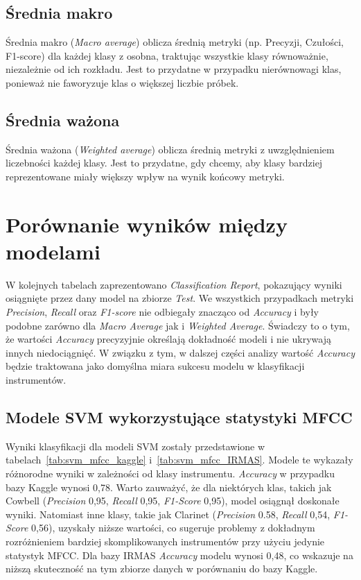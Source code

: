 \documentclass{SGGW-thesis}
\begin{document}
\subsection{Średnia makro}
Średnia makro (\textit{Macro average}) oblicza średnią metryki (np. Precyzji, Czułości, F1-score) dla każdej klasy z osobna, traktując wszystkie klasy równoważnie, niezależnie od ich rozkładu. Jest to przydatne w przypadku nierównowagi klas, ponieważ nie faworyzuje klas o większej liczbie próbek.

\subsection{Średnia ważona}
Średnia ważona (\textit{Weighted average}) oblicza średnią metryki z uwzględnieniem liczebności każdej klasy. Jest to przydatne, gdy chcemy, aby klasy bardziej reprezentowane miały większy wpływ na wynik końcowy metryki.

\section{Porównanie wyników między modelami}
W kolejnych tabelach zaprezentowano \textit{Classification Report}, pokazujący wyniki osiągnięte przez dany model na zbiorze \textit{Test}. We wszystkich przypadkach metryki \textit{Precision}, \textit{Recall} oraz \textit{F1-score} nie odbiegały znacząco od \textit{Accuracy} i były podobne zarówno dla \textit{Macro Average} jak i \textit{Weighted Average}. Świadczy to o tym, że wartości \textit{Accuracy} precyzyjnie określają dokładność modeli i nie ukrywają innych niedociągnięć. W związku z tym, w dalszej części analizy wartość \textit{Accuracy} będzie traktowana jako domyślna miara sukcesu modelu w klasyfikacji instrumentów.

\subsection{Modele SVM wykorzystujące statystyki MFCC}
Wyniki klasyfikacji dla modeli SVM zostały przedstawione w tabelach~\ref{tab:svm_mfcc_kaggle} i~\ref{tab:svm_mfcc_IRMAS}. Modele te wykazały różnorodne wyniki w zależności od klasy instrumentu. \textit{Accuracy} w przypadku bazy Kaggle wynosi 0,78. Warto zauważyć, że dla niektórych klas, takich jak Cowbell (\textit{Precision} 0,95, \textit{Recall} 0,95, \textit{F1-Score} 0,95), model osiągnął doskonałe wyniki. Natomiast inne klasy, takie jak Clarinet (\textit{Precision} 0.58, \textit{Recall} 0,54, \textit{F1-Score} 0,56), uzyskały niższe wartości, co sugeruje problemy z dokładnym rozróżnieniem bardziej skomplikowanych instrumentów przy użyciu jedynie statystyk MFCC. Dla bazy IRMAS \textit{Accuracy} modelu wynosi 0,48, co wskazuje na niższą skuteczność na tym zbiorze danych w porównaniu do bazy Kaggle.
\end{document}
